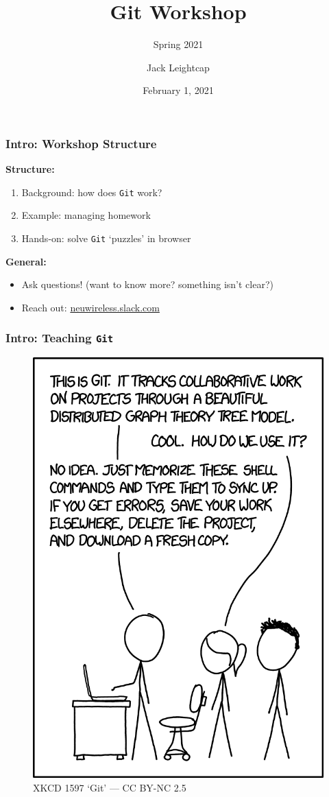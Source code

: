 \documentclass{beamer} \usetheme{Madrid}
\title{Git Workshop}
\subtitle{Spring 2021}
\author[]{Jack Leightcap\inst{1}\inst{2}}
\institute[IEEE, Wireless Club]{
	\inst{1}IEEE -- \url{nuieeeofficers@gmail.com}
	\and
	\inst{2}Wireless Club -- \url{nuwirelessclub@gmail.com}
}
\date[Spring 2021]{February 1, 2021}
\begin{document}
\frame{\titlepage}

\begin{frame}
	\frametitle{Intro: Workshop Structure}
	\centering \textbf{Structure:}
	\begin{enumerate}
		\setlength\itemsep{1em}
		\item Background: how does \texttt{Git} work?
		\item Example: managing homework
		\item Hands-on: solve \texttt{Git} `puzzles' in browser
	\end{enumerate}
	\vfill
	\centering \textbf{General:}
	\begin{itemize}
		\setlength\itemsep{1em}
		\item Ask questions!
		      (want to know more? something isn't clear?)
		\item Reach out: \url{neuwireless.slack.com}
	\end{itemize}
\end{frame}

\begin{frame}
	\frametitle{Intro: Teaching \texttt{Git}}
	\begin{figure}
		\includegraphics[height=\textheight-25mm]{xkcd.png}
		\caption{XKCD 1597 `Git' --- CC BY-NC 2.5}
	\end{figure}
\end{frame}
\end{document}

